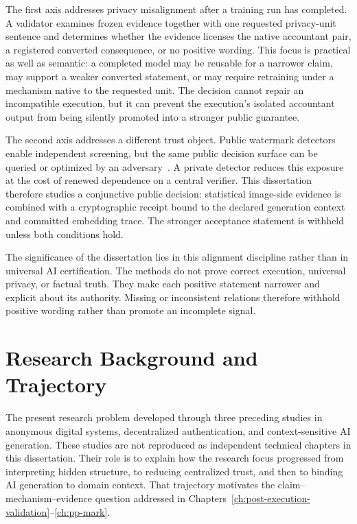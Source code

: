 The first axis addresses privacy misalignment after a training run has completed.
A validator examines frozen evidence together with one requested privacy-unit
sentence and determines whether the evidence licenses the native accountant pair,
a registered converted consequence, or no positive wording.  This focus is
practical as well as semantic: a completed model may be reusable for a narrower
claim, may support a weaker converted statement, or may require retraining under a
mechanism native to the requested unit.  The decision cannot repair an
incompatible execution, but it can prevent the execution's isolated accountant
output from being silently promoted into a stronger public guarantee.

The second axis addresses a different trust object.  Public watermark detectors
enable independent screening, but the same public decision surface can be queried
or optimized by an adversary~\cite{jiang2023evading,muller2025blackbox,
lin2025crack}.  A private detector reduces this exposure at the cost of renewed
dependence on a central verifier.  This dissertation therefore studies a
conjunctive public decision: statistical image-side evidence is combined with a
cryptographic receipt bound to the declared generation context and committed
embedding trace.  The stronger acceptance statement is withheld unless both
conditions hold.

The significance of the dissertation lies in this alignment discipline rather
than in universal AI certification.  The methods do not prove correct execution,
universal privacy, or factual truth.  They make each positive statement narrower
and explicit about its authority.  Missing or inconsistent relations therefore
withhold positive wording rather than promote an incomplete signal.


\section{Research Background and Trajectory}
\label{sec:ch1-trajectory}

The present research problem developed through three preceding studies in
anonymous digital systems, decentralized authentication, and context-sensitive
AI generation.  These studies are not reproduced as independent technical
chapters in this dissertation.  Their role is to explain how the research focus
progressed from interpreting hidden structure, to reducing centralized trust, and
then to binding AI generation to domain context.  That trajectory motivates the
claim--mechanism--evidence question addressed in Chapters~\ref{ch:post-execution-validation}--\ref{ch:pp-mark}.

